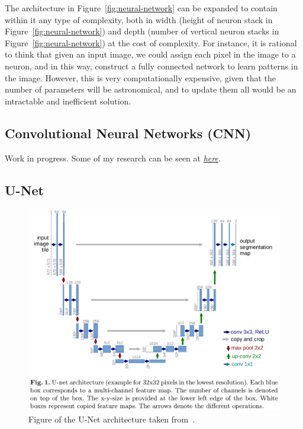 \documentclass[11pt,twoside]{report}
\begin{document}
The  architecture in Figure~\ref{fig:neural-network} can be expanded to contain within it any type of complexity, both in width (height of neuron stack in Figure~\ref{fig:neural-network}) and depth (number of vertical neuron stacks in Figure~\ref{fig:neural-network}) at the cost of complexity. For instance, it is rational to think that given an input image, we could assign each pixel in the image to a neuron, and in this way, construct a fully connected network to learn patterns in the image. However, this is very computationally expensive, given that the number of parameters will be astronomical, and to update them all would be an intractable and inefficient solution.

\subsection{Convolutional Neural Networks (CNN)}\label{sect:CNNs}

Work in progress. Some of my research can be seen at \href{https://github.com/AntonZhitomirsky/radiotherapy/blob/main/research/notes/programming}{\textit{here}}.

\subsection{U-Net}\label{sect:u-net}

\begin{figure}[H]
  \includegraphics[width=\linewidth,trim={0 7cm 0 0},clip]{../figures/u-net.png}
  \caption{Figure of the U-Net architecture taken from~\cite{U-Net}.}\label{fig:u-net}
\end{figure}
\end{document}
